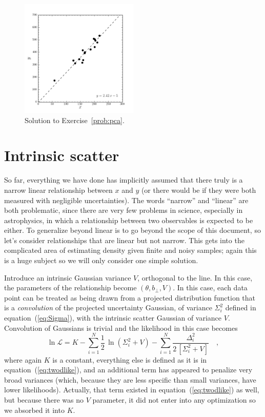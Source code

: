 \documentclass[12pt,twoside]{article}
\newcommand{\documentname}{document}
\newcommand{\equationname}{equation}
\newcommand{\problemname}{Exercise}
\newcounter{problem}
\newcommand{\like}{\mathscr{L}}
\newcommand{\bperp}{b_{\perp}}
\begin{document}
\begin{figure}[htb]
\includegraphics[width=0.5\textwidth]{ex15.png}
\caption{Solution to \problemname~\ref{prob:pca}.}\label{fig:pca}
\end{figure}

\section{Intrinsic scatter}\label{sec:scatter}

So far, everything we have done has implicitly assumed that there
truly is a narrow linear relationship between $x$ and $y$ (or there
would be if they were both measured with negligible uncertainties).
The words ``narrow'' and ``linear'' are both problematic, since there
are very few problems in science, especially in astrophysics, in which
a relationship between two observables is expected to be either.  To
generalize beyond linear is to go beyond the scope of this
\documentname, so let's consider relationships that are linear but not
narrow.  This gets into the complicated area of estimating density
given finite and noisy samples; again this is a huge subject so we
will only consider one simple solution.

Introduce an intrinsic Gaussian variance $V$, orthogonal to the line.
In this case, the parameters of the relationship become
$(\theta,\bperp,V)$.  In this case, each data point can be treated as
being drawn from a projected distribution function that is a
\emph{convolution} of the projected uncertainty Gaussian, of variance
$\Sigma_i^2$ defined in \equationname~(\ref{eq:Sigma}), with the
intrinsic scatter Gaussian of variance $V$.  Convolution of Gaussians
is trivial and the likelihood in this case becomes
\begin{equation}
\ln\like = K - \sum_{i=1}^N \frac{1}{2}\,\ln(\Sigma_{i}^2+V)
 - \sum_{i=1}^N \frac{\Delta_i^2}{2\,[\Sigma_{i}^2+V]} \quad ,
\end{equation}
where again $K$ is a constant, everything else is defined as it is in
\equationname~(\ref{eq:twodlike}), and an additional term has
appeared to penalize very broad variances (which, because they are
less specific than small variances, have lower likelihoods).
Actually, that term existed in \equationname~(\ref{eq:twodlike}) as
well, but because there was no $V$ parameter, it did not enter into
any optimization so we absorbed it into $K$.
\end{document}
